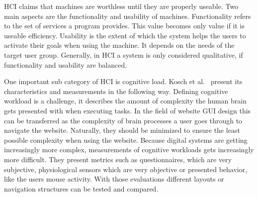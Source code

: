 \ac{HCI} claims that machines are worthless until they are properly useable. Two main aspects are the functionality and usability of machines.
Functionality refers to the set of services a program provides. This value becomes only value if it is useable efficiency.
Usability is the extent of which the system helps the users to activate their goals when using the machine. It depends on the needs of the target user group.
Generally, in \ac{HCI} a system is only considered qualitative, if functionality and usability are balanced.

One important sub category of \ac{HCI} is cognitive load. Kosch et al.~\cite{kosch_survey_2023} present its characteristics and measurements in the following way. 
Defining cognitive workload is a challenge, it describes the amount of complexity the human brain gets presented with when executing tasks. In the field of website \ac{GUI} design this can be transferred as the complexity of brain processes a user goes through to navigate the website. Naturally, they should be minimized to ensure the least possible complexity when using the website. %
Because digital systems are getting increasingly more complex, measurements of cognitive workloads gets increasingly more difficult. They present metrics such as questionnaires, which are very subjective, physiological sensors which are very objective or presented behavior, like the users mouse activity.
With those evaluations different layouts or navigation structures can be tested and compared. 




